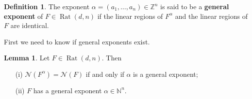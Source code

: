 \documentclass{article}
\theoremstyle{definition}
\newtheorem{lemma}[theorem]{Lemma}
\newtheorem{definition}[theorem]{Definition}
\DeclareMathOperator{\Rat}{Rat}
\begin{document}
\begin{definition}\hspace{1sp}\cite{maclagan2015introduction}\label{def:gen_exp}
The exponent $\alpha = (a_1, \dots, a_n) \in \mathbb{Z}^{n}$ is said to be a \textbf{general exponent} of $F \in \Rat(d, n)$ if the linear regions of $F^{\alpha}$ and the linear regions of $F$ are identical.
\end{definition}
First we need to know if general exponents exist.
\begin{lemma}\hspace{1sp}\cite{maclagan2015introduction}
Let $F \in \Rat(d, n)$. Then
\begin{itemize}
\item[(i)]
$\mathcal{N}(F^{\alpha}) = \mathcal{N}(F)$ if and only if $\alpha$ is a general exponent;
\item[(ii)]
$F$ has a general exponent $\alpha \in \mathbb{N}^{n}$.
\end{itemize}
\end{lemma}
\end{document}
